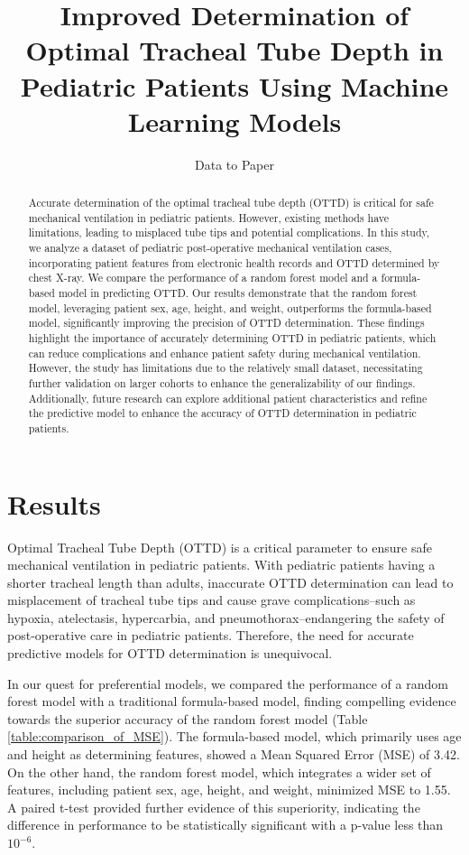 \documentclass[11pt]{article}
\title{Improved Determination of Optimal Tracheal Tube Depth in Pediatric Patients Using Machine Learning Models}
\author{Data to Paper}
\begin{document}
\maketitle
\begin{abstract}
Accurate determination of the optimal tracheal tube depth (OTTD) is critical for safe mechanical ventilation in pediatric patients. However, existing methods have limitations, leading to misplaced tube tips and potential complications. In this study, we analyze a dataset of pediatric post-operative mechanical ventilation cases, incorporating patient features from electronic health records and OTTD determined by chest X-ray. We compare the performance of a random forest model and a formula-based model in predicting OTTD. Our results demonstrate that the random forest model, leveraging patient sex, age, height, and weight, outperforms the formula-based model, significantly improving the precision of OTTD determination. These findings highlight the importance of accurately determining OTTD in pediatric patients, which can reduce complications and enhance patient safety during mechanical ventilation. However, the study has limitations due to the relatively small dataset, necessitating further validation on larger cohorts to enhance the generalizability of our findings. Additionally, future research can explore additional patient characteristics and refine the predictive model to enhance the accuracy of OTTD determination in pediatric patients.
\end{abstract}
\section*{Results}

Optimal Tracheal Tube Depth (OTTD) is a critical parameter to ensure safe mechanical ventilation in pediatric patients. With pediatric patients having a shorter tracheal length than adults, inaccurate OTTD determination can lead to misplacement of tracheal tube tips and cause grave complications--such as hypoxia, atelectasis, hypercarbia, and pneumothorax--endangering the safety of post-operative care in pediatric patients. Therefore, the need for accurate predictive models for OTTD determination is unequivocal.

In our quest for preferential models, we compared the performance of a random forest model with a traditional formula-based model, finding compelling evidence towards the superior accuracy of the random forest model (Table \ref{table:comparison_of_MSE}). The formula-based model, which primarily uses age and height as determining features, showed a Mean Squared Error (MSE) of 3.42. On the other hand, the random forest model, which integrates a wider set of features, including patient sex, age, height, and weight, minimized MSE to 1.55. A paired t-test provided further evidence of this superiority, indicating the difference in performance to be statistically significant with a p-value less than $10^{-6}$.
\end{document}
